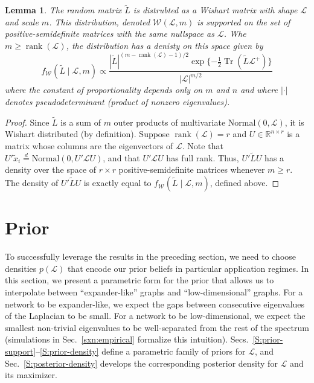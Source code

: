 \documentclass[12pt]{article}
\newcommand{\reals}{\mathbb{R}}
\DeclareMathOperator*{\Tr}{Tr}
\DeclareMathOperator*{\rank}{rank}
\theoremstyle{plain}
\newtheorem{lemma}[theorem]{Lemma}
\begin{document}
\begin{lemma}\label{L:approx-wishart}
  The random matrix $\tilde L$ is distrubted as a Wishart matrix with
  shape $\mathcal{L}$ and scale $m$.  This distribution, denoted
  $\mathcal{W}(\mathcal{L}, m)$ is supported on the set of
  positive-semidefinite matrices with the same nullspace as $\mathcal{L}$.  Whe
  $m \geq \rank(\mathcal{L})$, the distribution has a denisty on this space
  given by
  \begin{equation}\label{E:wishart-density}
   f_\mathcal{W}( \tilde L \mid \mathcal{L}, m)
      \propto
      \frac{|\tilde L|^{(m - \rank(\mathcal{L}) - 1)/2}
        \exp\{-\tfrac{1}{2} \Tr(\tilde L \mathcal{L}^+) \}}
        {|\mathcal{L}|^{m/2}}
  \end{equation}
  where the constant of proportionality depends only on $m$ and $n$
  and where $|\cdot|$ denotes pseudodeterminant (product of nonzero
  eigenvalues).
\end{lemma}
\begin{proof}
  Since $\tilde L$ is a sum of $m$ outer products of multivariate
  $\mathrm{Normal}(0, \mathcal{L})$, it is Wishart distributed
  (by definition).
  Suppose $\rank(\mathcal{L}) = r$ and
  $U \in \reals^{n \times r}$ is a matrix whose columns are the
    eigenvectors of $\mathcal{L}$.  Note that
    $U' \tilde x_i \overset{d}{=} \mathrm{Normal}(0, U' \mathcal{L} U)$,
    and that $U' \mathcal{L} U$ has full rank.  Thus,
    \(
      U' \tilde L U
    \)
    has a density over the space of $r \times r$ positive-semidefinite
    matrices whenever $m \geq r$.  The density of $U' \tilde L U$ is
    exactly equal to $f_\mathcal{W}(\tilde L \mid \mathcal{L}, m)$,
    defined above.
\end{proof}



\section{Prior}
\label{sxn:priors}

To successfully leverage the results in the preceding section, we need
to choose densities $p(\mathcal{L})$ that encode our prior beliefs in
particular application regimes.  In this section, we present a
parametric form for the prior that allows us to interpolate between
``expander-like'' graphs and ``low-dimensional'' graphs.  For a
network to be expander-like, we expect the gaps between consecutive
eigenvalues of the Laplacian to be small.  For a network to be
low-dimensional, we expect the smallest non-trivial eigenvalues to be
well-separated from the rest of the spectrum (simulations in
Sec.~\ref{sxn:empirical} formalize this intuition).
Secs.~\ref{S:prior-support}--\ref{S:prior-density} define a
parametric family of priors for $\mathcal{L}$, and
Sec.~\ref{S:posterior-density} develops the corresponding posterior
density for $\mathcal{L}$ and its maximizer.
\end{document}
